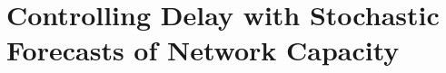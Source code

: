 \chapter{Controlling Delay with Stochastic Forecasts of Network Capacity}
\label{chap:sprout}

%




%




%
%
